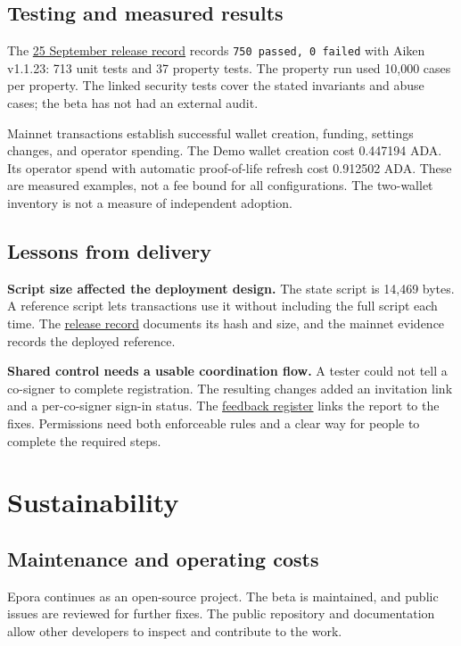 \documentclass[fontsize=10pt,paper=a4,DIV=16,parskip=half-]{scrartcl}
\newcommand{\repo}[2]{\href{https://github.com/schaier-io/epora-wallet/blob/main/#1}{#2}}
\begin{document}
\subsection*{Testing and measured results}
The \repo{docs/mainnet-beta-release.md}{25 September release record} records \texttt{750 passed, 0 failed} with Aiken v1.1.23: 713 unit tests and 37 property tests. The property run used 10,000 cases per property. The linked security tests cover the stated invariants and abuse cases; the beta has not had an external audit.

Mainnet transactions establish successful wallet creation, funding, settings changes, and operator spending. The Demo wallet creation cost 0.447194 ADA. Its operator spend with automatic proof-of-life refresh cost 0.912502 ADA. These are measured examples, not a fee bound for all configurations. The two-wallet inventory is not a measure of independent adoption.

\subsection*{Lessons from delivery}
\textbf{Script size affected the deployment design.} The state script is 14,469 bytes. A reference script lets transactions use it without including the full script each time. The \repo{docs/mainnet-beta-release.md}{release record} documents its hash and size, and the mainnet evidence records the deployed reference.

\textbf{Shared control needs a usable coordination flow.} A tester could not tell a co-signer to complete registration. The resulting changes added an invitation link and a per-co-signer sign-in status. The \repo{docs/testnet-feedback.md}{feedback register} links the report to the fixes. Permissions need both enforceable rules and a clear way for people to complete the required steps.

\newpage
\section{Sustainability}

\subsection*{Maintenance and operating costs}
Epora continues as an open-source project. The beta is maintained, and public issues are reviewed for further fixes. The public repository and documentation allow other developers to inspect and contribute to the work.
\end{document}
